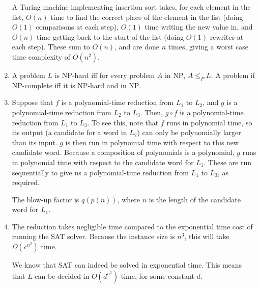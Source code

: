 \documentclass{article}
\begin{document}
\begin{enumerate}
    A Turing machine implementing insertion sort takes, for each element in the list, $O(n)$ time to find the correct place of the element in the list (doing $O(1)$ comparisons at each step), $O(1)$ time writing the new value in, and $O(n)$ time getting back to the start of the list (doing $O(1)$ rewrites at each step). These sum to $O(n)$, and are done $n$ times, giving a worst case time complexity of $O(n^2)$.
  \item A problem $L$ is NP-hard iff for every problem $A$ in $\mathrm{NP}$, $A \leq_P L$. A problem if NP-complete iff it is NP-hard and in $\mathrm{NP}$.
  \item Suppose that $f$ is a polynomial-time reduction from $L_1$ to $L_2$, and $g$ is a polynomial-time reduction from $L_2$ to $L_3$. Then, $g \circ f$ is a polynomial-time reduction from $L_1$ to $L_3$. To see this, note that $f$ runs in polynomial time, so its output (a candidate for a word in $L_2$) can only be polynomially larger than its input. $g$ is then run in polynomial time with respect to this new candidate word. Because a composition of polynomials is a polynomial, $g$ runs in polynomial time with respect to the candidate word for $L_1$. These are run sequentially to give us a polynomial-time reduction from $L_1$ to $L_3$, as required.

    The blow-up factor is $q(p(n))$, where $n$ is the length of the candidate word for $L_1$.
  \item The reduction takes negligible time compared to the exponential time cost of running the SAT solver. Because the instance size is $n^3$, this will take $\Omega(c^{n^3})$ time.

    We know that SAT can indeed be solved in exponential time. This means that $L$ can be decided in $O(d^{n^3})$ time, for some constant $d$.
\end{enumerate}
\end{document}
